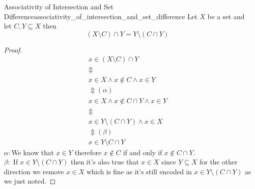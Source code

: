 \begin{proposition}{Associativity of Intersection and Set
Difference}{associativity_of_intersection_and_set_difference}
Let \( X \) be a set and let \( C, Y \subseteq X \) then
\[
\left( X \setminus C \right) \cap Y =  Y \setminus \left( C \cap Y \right) 
\]
\end{proposition}
\begin{proof}
    \begin{gather*}
        x \in  \left( X \setminus C \right) \cap Y \\
        \Updownarrow \\
        x \in  X \land x \not\in C \land x \in Y\\
        \Updownarrow \left( \alpha  \right) \\
        x \in  X \land x \not\in C \cap Y \land   x \in  Y\\
        \Updownarrow \\
        x \in Y \setminus \left( C \cap Y \right) \land x \in  X\\
        \Updownarrow \left( \beta  \right) \\
        x \in  Y \setminus C \cap  Y
    \end{gather*}
    \( \alpha : \)We know that \( x \in Y \) therefore  \( x \not\in C \) if
    and only if \( x \not\in C \cap  Y \). \\
    \( \beta : \) If \( x \in  Y \setminus \left( C \cap  Y \right)  \) then
    it's also true that \( x \in X \) since \( Y \subseteq X \) for the other
    direction we remove \( x \in X \) which is fine as it's still encoded in \(
    x \in Y \setminus \left( C \cap Y \right) \) as we just noted.
\end{proof}
